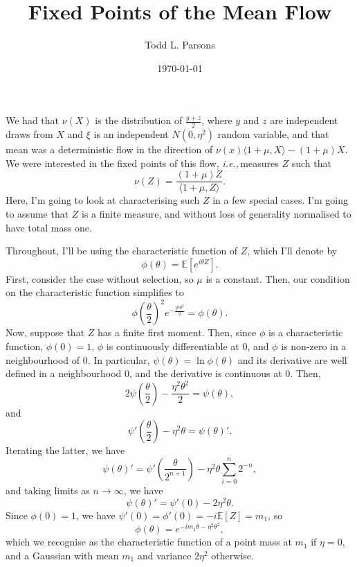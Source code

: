 \documentclass[11pt]{amsart}
\theoremstyle{remark}
\theoremstyle{definition}
\newcommand{\ie}{\textit{i.e.,}\,}
\begin{document}
\title{Fixed Points of the Mean Flow}
\author{Todd L. Parsons}
\address{Laboratoire de Probabilit\'{e}s et Mod\`{e}les Al\'{e}atoires, CNRS UMR 7599, Universit\'{e} Pierre et Marie Curie, Paris, 75005, France.}


\date{\today}



\maketitle

We had that $\nu(X)$ is the distribution of $\frac{y+z}{2}$, where $y$ and $z$ are independent draws from $X$ and $\xi$ is an independent $N(0,\eta^{2})$ random variable, and that mean was a deterministic flow in the direction of $\nu(x) \langle 1+ \mu, X \rangle - (1+\mu) X$.  We were interested in the fixed points of this flow, \ie measures $Z$ such that 
\[
	\nu(Z) = \frac{(1+\mu) Z}{\langle 1+ \mu, Z \rangle}.
\]
Here, I'm going to look at characterising such $Z$ in a few special cases.  I'm going to assume that $Z$ is a finite measure, and without loss of generality normalised to have total mass one.

Throughout, I'll be using the characteristic function of $Z$, which I'll denote by 
\[
	\phi(\theta) = \mathbb{E}\left[e^{i\theta Z}\right].
\]
First, consider the case without selection, so $\mu$ is a constant.  Then, our condition on the characteristic function simplifies to
\begin{equation}\label{CHARACTERISTIC}
	{\textstyle \phi\left(\frac{\theta}{2}\right)^{2}} e^{-\frac{\eta^{2}\theta^{2}}{2}} = \phi(\theta).
\end{equation}
Now, suppose that $Z$ has a finite first moment.  Then, since $\phi$ is a characteristic function, $\phi(0) = 1$, $\phi$ is continuously differentiable at 0, and $\phi$ is non-zero in a neighbourhood of 0.
In particular, $\psi(\theta) = \ln{\phi}(\theta)$ and its derivative are well defined in a neighbourhood 0, and the derivative is continuous at 0.  Then,
\[
	{\textstyle 2\psi\left(\frac{\theta}{2}\right)} -\frac{\eta^{2}\theta^{2}}{2} = \psi(\theta),
\]
and
\[ 
	\psi'\left(\frac{\theta}{2}\right) - \eta^{2} \theta = \psi(\theta)'.
\]
Iterating the latter, we have 
\[
	\psi(\theta)' = \psi'\left(\frac{\theta}{2^{n+1}}\right) - \eta^{2} \theta \sum_{i=0}^{n} 2^{-n},
\]
and taking limits as $n \to \infty$, we have
\[
	\psi(\theta)' = \psi'(0) - 2\eta^{2} \theta.
\]
Since $\phi(0) = 1$, we have $\psi'(0) = \phi'(0) = -i \mathbb{E}[Z] = m_{1}$, so 
\[
	\phi(\theta) = e^{-i m_{1} \theta - \eta^{2} \theta^{2}},
\]
which we recognise as the characteristic function of a point mass at $m_{1}$ if $\eta = 0$, and a Gaussian with mean $m_{1}$ and variance $2\eta^{2}$ otherwise.
\end{document}
